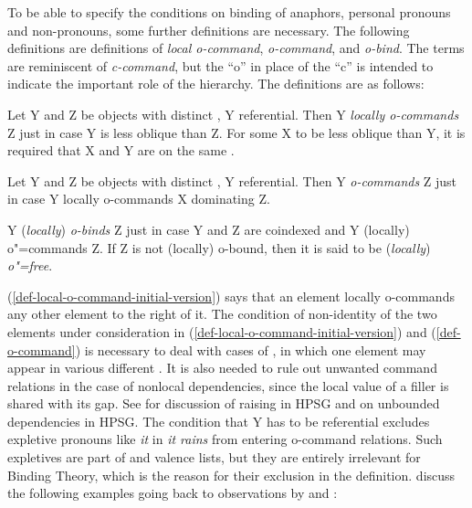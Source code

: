 \documentclass[output=paper,biblatex,babelshorthands,newtxmath,draftmode,colorlinks,citecolor=brown]{langscibook}
\begin{document}
To be able to specify the conditions on binding of anaphors, personal pronouns and non-pronouns, some further
definitions are necessary. The following definitions are definitions of \emph{local o-command}, \emph{o-command},
and \emph{o-bind}. The terms are reminiscent of \emph{c-command}, but the ``o'' in place of the ``c''
is intended to indicate the important role of the 
hierarchy. The definitions are as follows:

\eanoraggedright
\label{def-local-o-command-initial-version}\label{def-local-o-command}
Let Y and Z be  objects with distinct \localvs, Y referential. Then Y \emph{locally
o-commands} Z just in case Y is less oblique than Z.
\z
For some X to be less oblique than Y, it is required that X and Y are on the same \argstl.

\eanoraggedright
\label{def-o-command}
Let Y and Z be  objects with distinct \localvs, Y referential. Then Y \emph{o-commands} Z 
just in case Y locally o-commands X dominating Z.
\z

\eanoraggedright
\label{def-o-bind}
Y (\emph{locally}) \emph{o-binds} Z just in case Y and Z are coindexed and Y (locally) o"=commands Z. If Z
is not (locally) o-bound, then it is said to be (\emph{locally}) \emph{o"=free}.
\z

\noindent
(\ref{def-local-o-command-initial-version}) says that an \argst element locally o-commands any other \argst element
to the right of it. The condition of non-identity of the two elements under consideration in
(\ref{def-local-o-command-initial-version}) and (\ref{def-o-command}) is necessary to deal with cases of , in
which one element may appear in various different \argstls. It is also needed to rule out unwanted
command relations in the case of nonlocal dependencies, since the local value of a filler is shared
with its gap. See %
 for discussion of raising in HPSG and  on
unbounded dependencies in HPSG. The condition that Y has
to be referential excludes expletive pronouns like \emph{it} in \emph{it rains} from entering
o-command relations. Such expletives are part of \argst and valence lists, but they are entirely
irrelevant for Binding Theory, which is the reason for their exclusion in the
definition. 
\citet[]{ps2} discuss the following examples going back to observations by
\citet[]{FH83a-u} and \citet[]{Kuno87a-u}:
\end{document}

